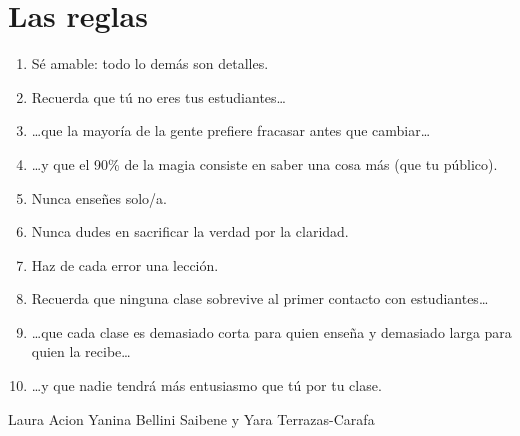 \chapter*{Las reglas}

\begin{enumerate}

\item Sé amable: todo lo demás son detalles.\\

\item Recuerda que tú no eres tus estudiantes{\ldots}\\

\item {\ldots}que la mayoría de la gente prefiere fracasar antes que cambiar{\ldots}\\

\item {\ldots}y que el 90\% de la magia consiste en saber una cosa más (que tu público).\\

\item Nunca enseñes solo/a.\\

\item Nunca dudes en sacrificar la verdad por la claridad.\\

\item Haz de cada error una lección.\\

\item Recuerda que ninguna clase sobrevive al primer contacto con estudiantes{\ldots}\\

\item {\ldots}que cada clase es demasiado corta para quien enseña y demasiado larga para quien la recibe{\ldots}\\

\item {\ldots}y que nadie tendrá más entusiasmo que tú por tu clase.

\end{enumerate}

\begin{reveiwer}
{Laura Acion}
{Yanina Bellini Saibene y Yara Terrazas-Carafa}
\end{reveiwer}

